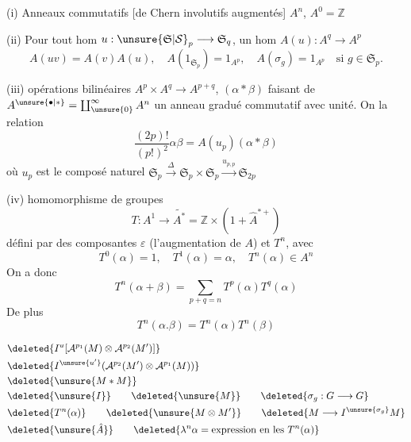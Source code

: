 (i) Anneaux commutatifs [de Chern involutifs augmentés] $A^n$, $A^0=\mathbb Z$

(ii) Pour tout hom $u:\unsure{\mathfrak S|\mathcal S}_p\longrightarrow\mathfrak S_q$, un hom $A(u):A^q\longrightarrow A^p$
\[
A(uv)=A(v)A(u),\quad A(1_{\mathfrak S_p})=1_{A^p},\quad A(\sigma_g)=1_{A^p}\quad\text{si }g\in\mathfrak S_p.
\]

(iii)  opérations bilinéaires $A^p\times A^q\longrightarrow A^{p+q}$, $(\alpha*\beta)$
faisant de $A^{\unsure{\bullet|*}}=\coprod_{\unsure{0}}^\infty A^n$ un anneau gradué commutatif
avec unité. On  la relation
\[
\frac{(2p)!}{(p!)^2}\alpha\beta=A(u_p)(\alpha*\beta)
\]
où $u_p$ est le composé naturel $\mathfrak S_p\xrightarrow{\Delta}\mathfrak S_p\times\mathfrak S_p\xrightarrow{u_{p,p}}\mathfrak S_{2p}$

(iv)  homomorphisme de groupes
\[
T:A^1\longrightarrow\widetilde{A^*}=\mathbb Z\times(1+\widehat A^{*+})
\]
défini par des composantes $\varepsilon$ (l'augmentation de $A$)
et $T^n$, avec
\[
T^0(\alpha)=1,\quad T^1(\alpha)=\alpha,\quad T^n(\alpha)\in A^n
\]
On a donc
\[
T^n(\alpha+\beta)=\sum_{p+q=n}T^p(\alpha)T^q(\alpha)
\]
De plus
\[
T^n(\alpha.\beta)=T^n(\alpha)T^n(\beta)
\]

\[
\begin{aligned}
&\deleted{I^u[\mathcal A^{p_1}(M)\otimes\mathcal A^{p_2}(M')]}\\
&\deleted{I^{\unsure{u'}}(\mathcal A^{p_2}(M')\otimes\mathcal A^{p_1}(M))}\\
&\deleted{\unsure{M*M}}\\
&\deleted{\unsure{I}}\qquad\deleted{\unsure{M}}\qquad\deleted{\sigma_g:G\longrightarrow G}\\
&\deleted{T^n(\alpha)}\qquad\deleted{\unsure{M\otimes M'}}\qquad\deleted{M\longrightarrow I^{\unsure{\sigma_g}}M}\\
&\deleted{\unsure{\hat A}}\qquad\deleted{\lambda^n\alpha=\text{expression en les }T^n(\alpha)}
\end{aligned}
\]
